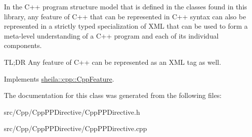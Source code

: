 In the C++ program structure model that is defined in the classes found in this library, any feature of C++ that can be represented in C++ syntax can also be represented in a strictly typed specialization of X\+ML that can be used to form a meta-\/level understanding of a C++ program and each of it\textquotesingle{}s individual components.

TL;DR Any feature of C++ can be represented as an X\+ML tag as well. 

Implements \hyperlink{classsheila_1_1cpp_1_1CppFeature_af32851fe8b1ce92bac4318605f0173db}{sheila\+::cpp\+::\+Cpp\+Feature}.



The documentation for this class was generated from the following files\+:\begin{DoxyCompactItemize}
\item 
src/\+Cpp/\+Cpp\+P\+P\+Directive/Cpp\+P\+P\+Directive.\+h\item 
src/\+Cpp/\+Cpp\+P\+P\+Directive/Cpp\+P\+P\+Directive.\+cpp\end{DoxyCompactItemize}
